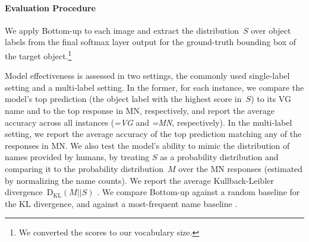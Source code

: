 \paragraph{Evaluation Procedure}
We apply Bottom-up to each image and extract the distribution~$S$ over object labels from the final softmax layer output for the ground-truth bounding box of the target object.\footnote{We converted the scores to our vocabulary size.} 

Model effectiveness is assessed in two settings, the commonly used single-label setting and a multi-label setting. 
In the former, for each instance, we compare the model's top prediction (the object label with the highest score in\ $S$) to its VG name and to the top response in MN, respectively, and report the average accuracy across all instances (\textit{=VG} and \textit{=MN}, respectively).
In the multi-label setting, we report the average accuracy of the top prediction matching any of the responses in MN.
We also test the model's ability to mimic the distribution of names provided by humans, by treating $S$ as a probability distribution and comparing it to the probability distribution~$M$ over the MN responses (estimated by normalizing the name counts). 
We report the average Kullback-Leibler divergence~$\mathrm{D_{KL}}(M||S)$ \cite{kullback1951information}.
We compare Bottom-up against a random baseline for the KL divergence, and against a most-frequent name baseline .

\iffalse
\textsl{top}: the model's top prediction
\begin{itemize}
	\item \textbf{=VG} The average model accuracy of \textsl{top} on the VG names
	\item \textbf{=MN} The average model accuracy of \textsl{top} on the top response in ManyNames
	\item \textbf{$\in$MN} The average model accuracy of \textsl{top} to match any name of the responses in ManyNames
	\item \textbf{KL} The average Kullback-Leibler divergence~$\mathrm{D_{KL}}(M||S)$ of the model's softmax output~$S$ and the  probability distribution~$M$ over ManyNames, estimated by normalizing the name counts per instance
\end{itemize}
\fi

